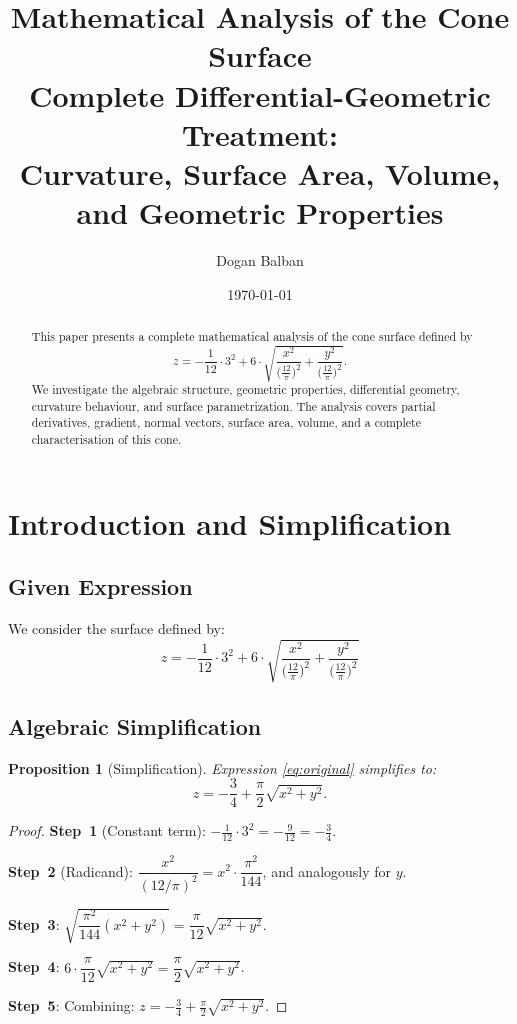 \documentclass[12pt,a4paper]{article}
\title{\textbf{Mathematical Analysis of the Cone Surface}\\[0.5em]
\large Complete Differential-Geometric Treatment:\\
Curvature, Surface Area, Volume, and Geometric Properties}
\author{Dogan Balban}
\date{\today}
\theoremstyle{plain}
\newtheorem{proposition}[theorem]{Proposition}
\theoremstyle{definition}
\theoremstyle{remark}
\begin{document}
\maketitle

\begin{abstract}
This paper presents a complete mathematical analysis of the cone surface defined by
\[
z = -\frac{1}{12}\cdot 3^{2} + 6\cdot\sqrt{\frac{x^{2}}{\bigl(\tfrac{12}{\pi}\bigr)^{2}}
+\frac{y^{2}}{\bigl(\tfrac{12}{\pi}\bigr)^{2}}}.
\]
We investigate the algebraic structure, geometric properties, differential geometry,
curvature behaviour, and surface parametrization. The analysis covers partial derivatives,
gradient, normal vectors, surface area, volume, and a complete characterisation of this
cone.
\end{abstract}

\tableofcontents
\newpage

\section{Introduction and Simplification}

\subsection{Given Expression}

We consider the surface defined by:
\begin{equation}\label{eq:original}
z = -\frac{1}{12}\cdot 3^{2} + 6\cdot\sqrt{\frac{x^{2}}{\bigl(\tfrac{12}{\pi}\bigr)^{2}}
+\frac{y^{2}}{\bigl(\tfrac{12}{\pi}\bigr)^{2}}}
\end{equation}

\subsection{Algebraic Simplification}

\begin{proposition}[Simplification]\label{prop:simplification}
Expression \eqref{eq:original} simplifies to:
\begin{equation}\label{eq:simplified}
z = -\frac{3}{4} + \frac{\pi}{2}\sqrt{x^2 + y^2}.
\end{equation}
\end{proposition}

\begin{proof}
\textbf{Step~1} (Constant term): $-\tfrac{1}{12}\cdot 3^{2} = -\tfrac{9}{12} = -\tfrac{3}{4}$.

\textbf{Step~2} (Radicand): $\dfrac{x^{2}}{(12/\pi)^{2}} = x^{2}\cdot\dfrac{\pi^2}{144}$,
and analogously for $y$.

\textbf{Step~3}: $\sqrt{\dfrac{\pi^2}{144}(x^2+y^2)} = \dfrac{\pi}{12}\sqrt{x^2+y^2}$.

\textbf{Step~4}: $6\cdot\dfrac{\pi}{12}\sqrt{x^2+y^2} = \dfrac{\pi}{2}\sqrt{x^2+y^2}$.

\textbf{Step~5}: Combining: $z = -\tfrac{3}{4}+\tfrac{\pi}{2}\sqrt{x^2+y^2}$.
\end{proof}
\end{document}
